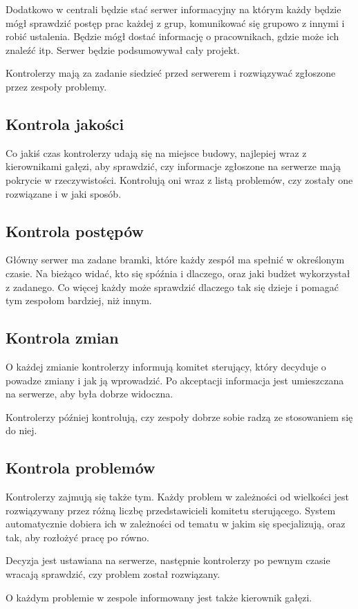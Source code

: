 Dodatkowo w centrali będzie stać serwer informacyjny na którym każdy będzie mógł sprawdzić postęp prac każdej z grup, komunikować się grupowo z innymi i robić ustalenia.
Będzie mógł dostać informację o pracownikach, gdzie może ich znaleźć itp.
Serwer będzie podsumowywał cały projekt.

Kontrolerzy mają za zadanie siedzieć przed serwerem i rozwiązywać zgłoszone przez zespoły problemy.

\subsection{Kontrola jakości}
Co jakiś czas kontrolerzy udają się na miejsce budowy, najlepiej wraz z kierownikami gałęzi, aby sprawdzić, czy informacje zgłoszone na serwerze mają pokrycie w rzeczywistości.
Kontrolują oni wraz z listą problemów, czy zostały one rozwiązane i w jaki sposób.

\subsection{Kontrola postępów}
Główny serwer ma zadane bramki, które każdy zespół ma spełnić w określonym czasie. Na bieżąco widać, kto się spóźnia i dlaczego, oraz jaki budżet wykorzystał z zadanego.
Co więcej każdy może sprawdzić dlaczego tak się dzieje i pomagać tym zespołom bardziej, niż innym.

\subsection{Kontrola zmian}
O każdej zmianie kontrolerzy informują komitet sterujący, który decyduje o powadze zmiany i jak ją wprowadzić.
Po akceptacji informacja jest umieszczana na serwerze, aby była dobrze widoczna.

Kontrolerzy później kontrolują, czy zespoły dobrze sobie radzą ze stosowaniem się do niej.

\subsection{Kontrola problemów}
Kontrolerzy zajmują się także tym. Każdy problem w zależności od wielkości jest rozwiązywany przez różną liczbę przedstawicieli komitetu sterującego.
System automatycznie dobiera ich w zależności od tematu w jakim się specjalizują, oraz tak, aby rozłożyć pracę po równo.

Decyzja jest ustawiana na serwerze, następnie kontrolerzy po pewnym czasie wracają sprawdzić, czy problem został rozwiązany.

O każdym problemie w zespole informowany jest także kierownik gałęzi.



